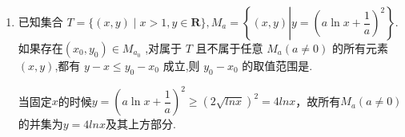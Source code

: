 \begin{enumerate}
\begin{enumerate}
\begin{jieda}
\begin{enumerate}
                $g'\left( x\right)  = 2f'\left( {2x}\right)  - {4bf}'\left( x\right) = 2\left\lbrack  {{e}^{2x} + {e}^{-{2x}} - {2b}\left( {{e}^{x} + {e}^{-x}}\right)  + \left( {{4b} - 2}\right) }\right\rbrack$

                令$t = {{e}^{x} + {e}^{-x}}$，$t \geq 2$，因此$g'(x) = h(t) = 2[(t^2-2)-2bt+(4b-2)] = 2[t^2-2bt+(4b-4)]$

                令$h(t) = 0$，$t = 2$或$2b-2$，因此$g'(0) = h(2) = 0$
                

                \item 考虑$g\left( {\ln \sqrt{2}}\right)  = \dfrac{3}{2} - 2\sqrt{2}b + 2\left( {{2b} - 1}\right) \ln 2$

                当$b \leq 2$时，$g(x)$在$(0, +\infty)$严增，故$g\left( {\ln \sqrt{2}}\right) > 0$，代入$b = 2$，可得$g\left( {\ln \sqrt{2}}\right)  = \dfrac{3}{2} - 4\sqrt{2} + 6\ln 2 > 0$，故$\ln 2 > \dfrac{8\sqrt{2} - 3}{12} > {0.6928}$

                当$b > 2$时，$g(x)$在$(0, +\infty)$先减后增，考虑令$g\left( {\ln \sqrt{2}}\right) < 0$

                $g(x)$在$\left(0, \ln \left( {b - 1 + \sqrt{{b}^{2} - {2b}}}\right)\right)$严减，故当$\ln \left( {b - 1 + \sqrt{{b}^{2} - {2b}}}\right) \geq ln\sqrt{2}$时必有$g\left( {\ln \sqrt{2}}\right) < 0$，即${b - 1 + \sqrt{{b}^{2} - {2b}}} \geq \sqrt{2}$，解得$b \geq \dfrac{3\sqrt{2}}{4} + 1$

                代入$b = \dfrac{3\sqrt{2}}{4} + 1$, $g\left( {\ln \sqrt{2}}\right)  =  - \dfrac{3}{2} - 2\sqrt{2} + \left( {3\sqrt{2} + 2}\right) \ln 2 < 0$ ,$\ln 2 < \dfrac{{18} + \sqrt{2}}{28} < {0.6934}$

                所以 $\ln 2$ 的近似值为 $0.693$.
            \end{enumerate}
        \end{jieda}
        \item 已知集合 $T = \{ \left( {x,y}\right)  \mid  x > 1,y \in  \mathbf{R}\} ,{M}_{a} = \left\{  \left( {x,y}\right)  \left|y = {\left( a\ln x + \dfrac{1}{a}\right) }^{2} \right. \right\}$. 如果存在$\left( {{x}_{0},{y}_{0}}\right)  \in  {M}_{{a}_{0}}$ ,对属于 $T$ 且不属于任意 ${M}_{a}\left( {a \neq  0}\right)$ 的所有元素$(x,y)$,都有 $y - x \leq  {y}_{0} - {x}_{0}$ 成立,则 ${y}_{0} - {x}_{0}$ 的取值范围是\blkda[3]{$\left[8ln2 - 4, +\infty\right)$}.
        \begin{jieda}
            当固定$x$的时候$y = \left( a\ln x + \dfrac{1}{a}\right)^2 \geq (2\sqrt{lnx})^2 = 4lnx$，故所有${M}_{a}\left( {a \neq  0}\right)$的并集为$y = 4lnx$及其上方部分.


\end{jieda}
\end{enumerate}
\end{enumerate}

